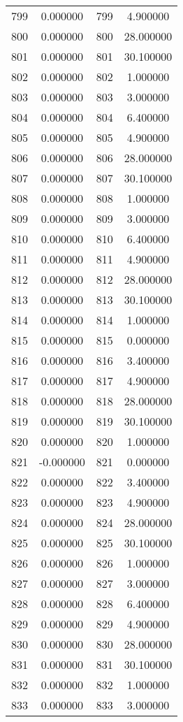 \documentclass[12pt]{article}
\begin{document}
\begin{longtable}{@{}cccc@{}}
799 & 0.000000 & 799 & 4.900000 \\
800 & 0.000000 & 800 & 28.000000 \\
801 & 0.000000 & 801 & 30.100000 \\
802 & 0.000000 & 802 & 1.000000 \\
803 & 0.000000 & 803 & 3.000000 \\
804 & 0.000000 & 804 & 6.400000 \\
805 & 0.000000 & 805 & 4.900000 \\
806 & 0.000000 & 806 & 28.000000 \\
807 & 0.000000 & 807 & 30.100000 \\
808 & 0.000000 & 808 & 1.000000 \\
809 & 0.000000 & 809 & 3.000000 \\
810 & 0.000000 & 810 & 6.400000 \\
811 & 0.000000 & 811 & 4.900000 \\
812 & 0.000000 & 812 & 28.000000 \\
813 & 0.000000 & 813 & 30.100000 \\
814 & 0.000000 & 814 & 1.000000 \\
815 & 0.000000 & 815 & 0.000000 \\
816 & 0.000000 & 816 & 3.400000 \\
817 & 0.000000 & 817 & 4.900000 \\
818 & 0.000000 & 818 & 28.000000 \\
819 & 0.000000 & 819 & 30.100000 \\
820 & 0.000000 & 820 & 1.000000 \\
821 & -0.000000 & 821 & 0.000000 \\
822 & 0.000000 & 822 & 3.400000 \\
823 & 0.000000 & 823 & 4.900000 \\
824 & 0.000000 & 824 & 28.000000 \\
825 & 0.000000 & 825 & 30.100000 \\
826 & 0.000000 & 826 & 1.000000 \\
827 & 0.000000 & 827 & 3.000000 \\
828 & 0.000000 & 828 & 6.400000 \\
829 & 0.000000 & 829 & 4.900000 \\
830 & 0.000000 & 830 & 28.000000 \\
831 & 0.000000 & 831 & 30.100000 \\
832 & 0.000000 & 832 & 1.000000 \\
833 & 0.000000 & 833 & 3.000000 \\

\end{longtable}
\end{document}
